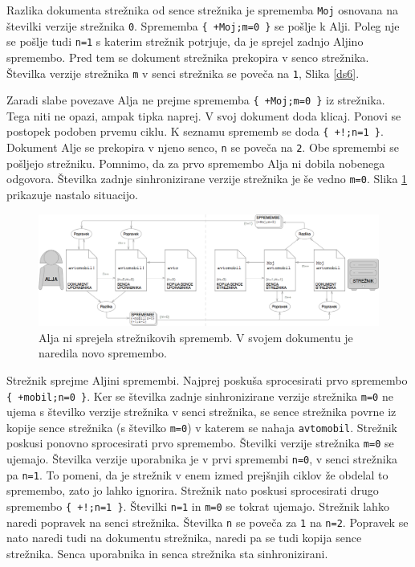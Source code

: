 \documentclass[a4paper, 12pt, twoside]{book}
\begin{document}
Razlika dokumenta strežnika od sence strežnika je sprememba {\tt Moj} osnovana na številki verzije strežnika {\tt 0}. Sprememba {\tt \{ +Moj;m=0 \}} se pošlje k Alji. Poleg nje se pošlje tudi {\tt n=1} s katerim strežnik potrjuje, da je sprejel zadnjo Aljino spremembo. Pred tem se dokument strežnika prekopira v senco strežnika. Številka verzije strežnika {\tt m} v senci strežnika se poveča na {\tt 1}, Slika \ref{ds6}.

Zaradi slabe povezave Alja ne prejme sprememba {\tt \{ +Moj;m=0 \}} iz strežnika. Tega niti ne opazi, ampak tipka naprej. V svoj dokument doda klicaj. Ponovi se postopek podoben prvemu ciklu. K seznamu sprememb se doda {\tt \{ +!;n=1 \}}. Dokument Alje se prekopira v njeno senco, {\tt n} se poveča na {\tt 2}. Obe spremembi se pošljejo strežniku. Pomnimo, da za prvo spremembo Alja ni dobila nobenega odgovora. Številka zadnje sinhronizirane verzije strežnika je še vedno {\tt m=0}. Slika \ref{ds7} prikazuje nastalo situacijo.

\begin{figure}[placement h]
\begin{center}
\includegraphics[width=16cm]{ds7.png}
\end{center}
\caption{Alja ni sprejela strežnikovih sprememb. V svojem dokumentu je naredila novo spremembo.}
\label{ds7}
\end{figure}

Strežnik sprejme Aljini spremembi. Najprej poskuša sprocesirati prvo spremembo {\tt \{ +mobil;n=0 \}}. Ker se številka zadnje sinhronizirane verzije strežnika {\tt m=0} ne ujema s številko verzije strežnika v senci strežnika, se sence strežnika povrne iz kopije sence strežnika (s številko {\tt m=0}) v katerem se nahaja {\tt avtomobil}. Strežnik poskusi ponovno sprocesirati prvo spremembo. Številki verzije strežnika {\tt m=0} se ujemajo. Številka verzije uporabnika je v prvi spremembi {\tt n=0}, v senci strežnika pa {\tt n=1}. To pomeni, da je strežnik v enem izmed prejšnjih ciklov že obdelal to spremembo, zato jo lahko ignorira. Strežnik nato poskusi sprocesirati drugo spremembo {\tt \{ +!;n=1 \}}. Številki {\tt n=1} in {\tt m=0} se tokrat ujemajo. Strežnik lahko naredi popravek na senci strežnika. Številka {\tt n} se poveča za {\tt 1} na {\tt n=2}. Popravek se nato naredi tudi na dokumentu strežnika, naredi pa se tudi kopija sence strežnika. Senca uporabnika in senca strežnika sta sinhronizirani.
\end{document}
